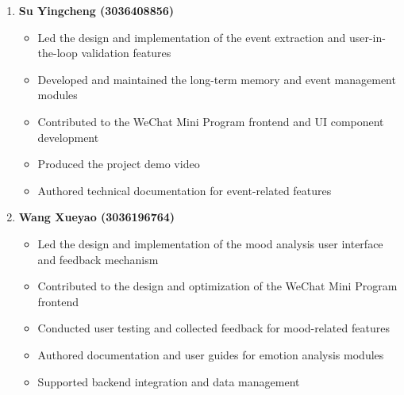 \begin{enumerate}
    \item \textbf{Su Yingcheng (3036408856)} 
    \begin{itemize}
        \item Led the design and implementation of the event extraction and user-in-the-loop validation features
        \item Developed and maintained the long-term memory and event management modules
        \item Contributed to the WeChat Mini Program frontend and UI component development
        \item Produced the project demo video
        \item Authored technical documentation for event-related features
    \end{itemize}

    \item \textbf{Wang Xueyao (3036196764)} 
    \begin{itemize}
        \item Led the design and implementation of the mood analysis user interface and feedback mechanism
        \item Contributed to the design and optimization of the WeChat Mini Program frontend
        \item Conducted user testing and collected feedback for mood-related features
        \item Authored documentation and user guides for emotion analysis modules
        \item Supported backend integration and data management
    \end{itemize}
\end{enumerate} 